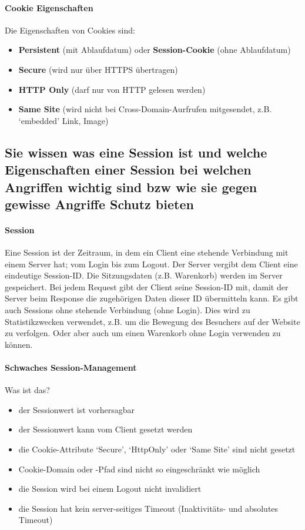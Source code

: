 \documentclass[10pt,a4paper]{article}
\begin{document}
\paragraph*{Cookie Eigenschaften}Die Eigenschaften von Cookies sind:
\begin{itemize}[noitemsep,topsep=0pt,leftmargin=*]
    \item \textbf{Persistent} (mit Ablaufdatum) oder \textbf{Session-Cookie} (ohne Ablaufdatum)
    \item \textbf{Secure} (wird nur über HTTPS übertragen)
    \item \textbf{HTTP Only} (darf nur von HTTP gelesen werden)
    \item \textbf{Same Site} (wird nicht bei Cross-Domain-Aurfrufen mitgesendet, z.B. `embedded' Link, Image)
\end{itemize}


\subsection*{Sie wissen was eine Session ist und welche Eigenschaften einer Session bei welchen Angriffen wichtig sind bzw wie sie gegen gewisse Angriffe Schutz bieten}

\paragraph*{Session} Eine Session ist der Zeitraum, in dem ein Client eine stehende Verbindung mit einem Server hat; vom Login bis zum Logout. Der Server vergibt dem Client eine eindeutige Session-ID. Die Sitzungsdaten (z.B. Warenkorb) werden im Server gespeichert. Bei jedem Request gibt der Client seine Session-ID mit, damit der Server beim Response die zugehörigen Daten dieser ID übermitteln kann. Es gibt auch Sessions ohne stehende Verbindung (ohne Login). Dies wird zu Statistikzwecken verwendet, z.B. um die Bewegung des Besuchers auf der Website zu verfolgen. Oder aber auch um einen Warenkorb ohne Login verwenden zu können.

\paragraph*{Schwaches Session-Management}Was ist das?
\begin{itemize}[noitemsep,topsep=0pt,leftmargin=*]
    \item der Sessionwert ist vorhersagbar
    \item der Sessionwert kann vom Client gesetzt werden
    \item die Cookie-Attribute `Secure', `HttpOnly' oder `Same Site' sind nicht gesetzt
    \item Cookie-Domain oder -Pfad sind nicht so eingeschränkt wie möglich
    \item die Session wird bei einem Logout nicht invalidiert
    \item die Session hat kein server-seitiges Timeout (Inaktivitäts- und absolutes Timeout)
\end{itemize}
\end{document}
